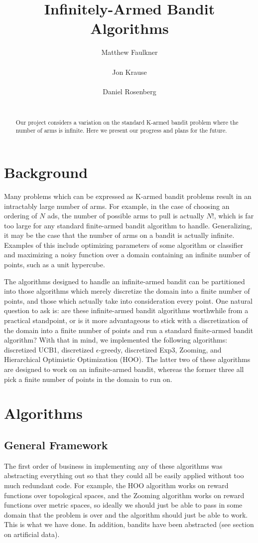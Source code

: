 \documentclass{article}
\title{Infinitely-Armed Bandit Algorithms}
\author{
Matthew Faulkner\\
\\
\And
Jon Krause \\
\\
\And
Daniel Rosenberg \\
\\
}
\begin{document}
\maketitle

\begin{abstract}
Our project considers a variation on the standard K-armed bandit 
problem where the number of arms is infinite. Here we present
our progress and plans for the future.
\end{abstract}

\section{Background}
Many problems which can be expressed as K-armed bandit problems result
in an intractably large number of arms.  For example, in the case of
choosing an ordering of $N$ ads, the number of possible arms to pull
is actually $N!$, which is far too large for any standard finite-armed
bandit algorithm to handle.  Generalizing, it may be the case that the
number of arms on a bandit is actually infinite.  Examples of this
include optimizing parameters of some algorithm or classifier and
maximizing a noisy function over a domain containing an infinite
number of points, such as a unit hypercube.

The algorithms designed to handle an infinite-armed bandit can be
partitioned into those algorithms which merely discretize the domain
into a finite number of points, and those which actually take into
consideration every point.  One natural question to ask is: are these
infinite-armed bandit algorithms worthwhile from a practical
standpoint, or is it more advantageous to stick with a discretization
of the domain into a finite number of points and run a standard
finite-armed bandit algorithm?  With that in mind, we implemented the
following algorithms: discretized UCB1, discretized $\epsilon$-greedy,
discretized Exp3, Zooming\cite{Zooming}, and Hierarchical Optimistic
Optimization (HOO)\cite{xArmed}.  The latter two of these algorithms
are designed to work on an infinite-armed bandit, whereas the former
three all pick a finite number of points in the domain to run on.

\section{Algorithms}
\subsection{General Framework}
The first order of business in implementing any of these algorithms was
abstracting everything out so that they could all be easily applied
without too much redundant code.  For example, the HOO algorithm works
on reward functions over topological spaces, and the Zooming algorithm
works on reward functions over metric spaces, so ideally we should just
be able to pass in some domain that the problem is over and the algorithm
should just be able to work.  This is what we have done.  In addition,
bandits have been abstracted (see section on artificial data).
\end{document}
